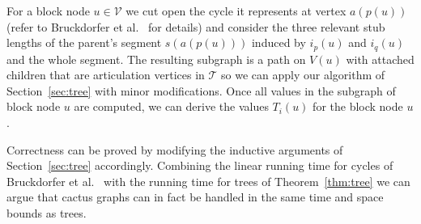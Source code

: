 \documentclass[a4paper,english,numberwithinsect]{eurocg18}
\newcommand{\maxsped}{\ensuremath{\textsc{MaxSPED}}\xspace}
\begin{document}
For a block node $ u \in \mathcal V $ we cut open the cycle it represents at vertex $a(p(u))$ (refer to Bruckdorfer et al.~\cite{bcgkmn-pped-17} for details) and consider the three relevant stub lengths of the parent's segment $s(a(p(u)))$ induced by $i_p(u)$ and $i_q(u)$ and the whole segment. 
The resulting subgraph is a path on $V(u)$ with attached children that are articulation vertices in $\mathcal T$ so we can apply our algorithm of Section~\ref{sec:tree} with minor modifications.
Once all values in the subgraph of block node $u$ are computed, we can derive the values $T_i(u)$ for the block node $u$.


Correctness can be proved by modifying the inductive arguments of Section~\ref{sec:tree} accordingly. 
Combining the linear running time for cycles of Bruckdorfer et al.~\cite{bcgkmn-pped-17} with the running time for trees of Theorem~\ref{thm:tree} we can argue that cactus graphs can in fact be handled in the same time and space bounds as trees.

\end{document}
